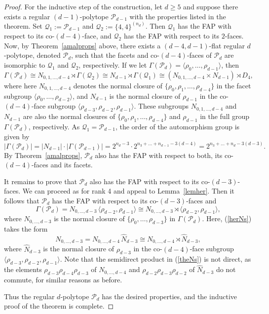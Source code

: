 \documentclass[10pt,a4paper]{amsart}
\theoremstyle{definition}
\begin{document}
\begin{proof}
For the inductive step of the construction, let $d\geq 5$ and suppose there exists a regular $(d-1)$-polytope ${\mathcal P}_{d-1}$ with the properties listed in the theorem. Set ${\mathcal Q}_1:=\mathcal{P}_{d-1}$ and ${\mathcal Q}_2:=\{4,4\}^{(n_d)}$. Then ${\mathcal Q}_1$ has the FAP with respect to its co-$(d-4)$-face, and ${\mathcal Q}_2$ has the FAP with respect to its $2$-faces. Now, by Theorem~\ref{amalprops} above, there exists a $(d-4,d-1)$-flat regular $d$-polytope, denoted $\mathcal{P}_d$,  such that the facets and co-$(d-4)$-faces of ${\mathcal P}_d$ are isomorphic to ${\mathcal Q}_1$ and ${\mathcal Q}_2$, respectively. If we let $\Gamma({\mathcal P}_d)=\langle\rho_0,\ldots,\rho_{d-1}\rangle$, then 
\[\Gamma({\mathcal P}_d)
\cong N_{0,1,\ldots,d-4}\rtimes\Gamma(\mathcal{Q}_2)
\cong N_{d-1}\rtimes\Gamma(\mathcal{Q}_1)
\cong (N_{0,1,\ldots,d-4}\times N_{d-1})\rtimes D_4 ,\]
where here $N_{0,1,\ldots,d-4}$ denotes the normal closure of $\{\rho_0,\rho_1,\ldots,\rho_{d-4}\}$ in the facet subgroup $\langle\rho_0,\ldots,\rho_{d-2}\rangle$, and $N_{d-1}$ is the normal closure of $\rho_{d-1}$ in the co-$(d-4)$-face subgroup $\langle\rho_{d-3},\rho_{d-2},\rho_{d-1}\rangle$. These subgroups $N_{0,1,\ldots,d-4}$ and $N_{d-1}$ are also the normal closures of $\{\rho_0,\rho_1,\ldots,\rho_{d-4}\}$ and $\rho_{d-1}$ in the full group $\Gamma({\mathcal P}_d)$, respectively. As $\mathcal{Q}_{1}=\mathcal{P}_{d-1}$, the order of the automorphism group is given by 
\[|\Gamma({\mathcal P}_d)| = |N_{d-1}|\cdot |\Gamma(\mathcal{P}_{d-1})|
=2^{n_{d}-3}\cdot 2^{n_3+\ldots +n_{d-1} -3(d-4)} = 2^{n_3+\ldots +n_{d} -3(d-3)}.\]
By Theorem~\ref{amalprops}, ${\mathcal P}_d$ also has the FAP with respect to both, its co-$(d-4)$-faces and its facets.

It remains to prove that ${\mathcal P}_d$ also has the FAP with respect to its co-$(d-3)$-faces. We can proceed as for rank 4 and appeal to Lemma~\ref{lemher}. Then it follows that $\mathcal{P}_d$ has the FAP with respect to its co-$(d-3)$-faces and 
\[\Gamma({\mathcal P}_d) = N_{0,\ldots,d-3}\, \langle\rho_{d-2},\rho_{d-1}\rangle 
\cong N_{0,\ldots,d-3}\rtimes \langle\rho_{d-2},\rho_{d-1}\rangle,\]
where $N_{0,\ldots,d-3}$ is the normal closure of $\{\rho_0,\ldots,\rho_{d-3}\}$ in $\Gamma({\mathcal P}_d)$. Here, (\ref{herNs}) takes the form 
\begin{equation}
\label{theNs}
N_{0,\ldots,d-3}=N_{0,\ldots,d-4} \,\hat{N}_{d-3}\cong N_{0,\ldots,d-4} \rtimes \hat{N}_{d-3},
\end{equation}
where $\hat{N}_{d-3}$ is the normal closure of $\rho_{d-3}$ in the co-$(d-4)$-face subgroup $\langle\rho_{d-3},\rho_{d-2},\rho_{d-1}\rangle$.
Note that the semidirect product in (\ref{theNs}) is not direct, as the elements $\rho_{d-3}\rho_{d-4}\rho_{d-3}$ of $N_{0,\ldots,d-4}$ and $\rho_{d-2}\rho_{d-3}\rho_{d-2}$ of $\hat{N}_{d-3}$ do not commute, for similar reasons as before.

Thus the regular $d$-polytope ${\mathcal P}_d$ has the desired properties, and the inductive proof of the theorem is complete.
\end{proof}
\end{document}
